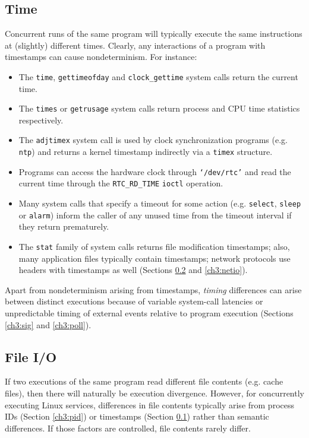 \subsection{Time} \label{ch3:time}
Concurrent runs of the same program will typically
execute the same instructions at (slightly) different times.
Clearly, any interactions of a program with timestamps
can cause nondeterminism. For instance:

\begin{itemize}
\item The \texttt{time}, \texttt{gettimeofday} and \texttt{clock\_gettime}
 system calls return the current time.
\item The \texttt{times} or \texttt{getrusage} system calls
return process and CPU time statistics respectively.
\item The \texttt{adjtimex} system call is used 
by clock synchronization programs (e.g. \texttt{ntp}) 
and returns a kernel timestamp indirectly via 
a \texttt{timex} structure.
\item Programs can access the hardware clock
through \texttt{`/dev/rtc'} and read the current time
through the \texttt{RTC\_RD\_TIME} \texttt{ioctl}
operation.
\item Many system calls that specify a timeout
for some action (e.g. \texttt{select}, \texttt{sleep} or \texttt{alarm})
inform the caller of any unused time from the timeout interval if they
return prematurely.
\item The \texttt{stat} family of system calls returns file
  modification timestamps; also, many application files typically contain timestamps;
  network protocols use headers with timestamps as well (Sections \ref{ch3:fileio}
  and \ref{ch3:netio}).
\end{itemize}

Apart from nondeterminism arising
from timestamps, {\em timing} differences
can arise between distinct executions 
because of variable system-call latencies 
or unpredictable timing of
external events relative
to program execution (Sections \ref{ch3:sig} and \ref{ch3:poll}).

\subsection{File I/O} \label{ch3:fileio}
 \newline
If two executions of the same program read different
file contents (e.g. cache files), then
there will naturally be execution divergence.
However, for concurrently executing Linux services,
differences in file contents typically arise
from process IDs (Section \ref{ch3:pid}) or timestamps (Section \ref{ch3:time})
rather than semantic differences.
If those factors are controlled, file contents rarely differ. \newline

